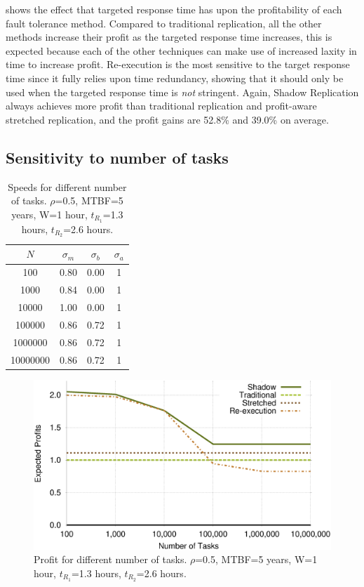  shows the effect that targeted response time has upon
the profitability of each fault tolerance method. Compared to traditional replication, all the other methods increase their profit as the targeted
response time increases, this is expected because each of the other
techniques can make use of increased laxity in time to increase
profit. Re-execution is the most sensitive to the target response
time since it fully relies upon time redundancy, showing that it should only be used when the targeted response time is \emph{not} stringent. 
Again, Shadow Replication always achieves more profit than traditional
replication and profit-aware stretched replication, and the profit
gains are 52.8\% and 39.0\% on average. 


\subsection{Sensitivity to number of tasks}


\begin{table}[!h]\small
	\caption{Speeds for different number of tasks. $\rho$=0.5, MTBF=5 years, W=1 hour, $t_{R_1}$=1.3 hours, $t_{R_2}$=2.6 hours.}
	\centering
		\begin{tabular}{|c|c|c|c|}
		\hline
		$N$ & $\sigma_m$ & $\sigma_b$ & $\sigma_a$ \\
		\hline
		100			&	0.80	&	0.00	&	1 \\
		\hline
		1000		&	0.84	&	0.00	&	1 \\
		\hline
		10000		&	1.00	&	0.00	&	1 \\
		\hline
		100000		&	0.86	&	0.72	&	1 \\
		\hline
		1000000		&	0.86	&	0.72	&	1 \\
		\hline
		10000000	&	0.86	&	0.72	&   1 \\
		\hline
		\end{tabular}
	\label{tbl:n}
\end{table}

\begin{figure}[!h]	
	\begin{center}
			\includegraphics[width=\columnwidth]{diagrams/n_profit.eps}
	\end{center}
	\caption{Profit for different number of tasks. $\rho$=0.5, MTBF=5 years, W=1 hour, $t_{R_1}$=1.3 hours, $t_{R_2}$=2.6 hours.}
	\label{fig:n}
\end{figure}

